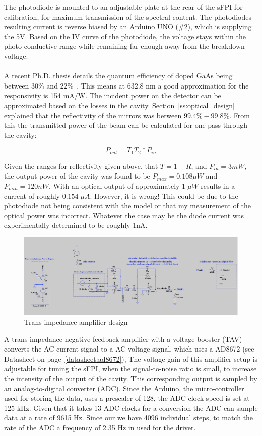 \documentclass[12pt,journal]{IEEEtran}
\begin{document}
The photodiode is mounted to an adjustable plate at the rear of the sFPI for calibration, for maximum transmission of the spectral content. The photodiodes resulting current is reverse biased by an Arduino UNO (\#2), which is supplying the 5V. Based on the IV curve of the photodiode, the voltage stays within the photo-conductive range while remaining far enough away from the breakdown voltage. 
\\\\
A recent Ph.D. thesis details the quantum efficiency of doped GaAs being between 30\% and 22\%~\cite{responsivity}. This means at 632.8 nm a good approximation for the responsivity is 154 mA/W. The incident power on the detector can be approximated based on the losses in the cavity. Section~\ref{ss:optical_design} explained that the reflectivity of the mirrors was between $99.4\% - 99.8\%$. From this the transmitted power of the beam can be calculated for one pass through the cavity:

\begin{equation}
P_{out} = T_1T_2*P_{in}
\end{equation}

Given the ranges for reflectivity given above, that $T = 1-R$, and $P_{in} = 3 mW$, the output power of the cavity was found to be $P_{max} = 0.108 \mu W$ and $P_{min} = 120 nW$. With an optical output of approximately $1\;\mu W$ results in a current of roughly $0.154\;\mu A$. However, it is wrong! This could be due to the photodiode not being consistent with the model or that my measurement of the optical power was incorrect. Whatever the case may be the diode current was experimentally determined to be roughly 1nA. 

\begin{figure}
	\centering
	\includegraphics[width=\textwidth]{./transimpedance_amp_design.png}
	\caption{Trans-impedance amplifier design}
	\label{fig{transimpedance-amp}}
\end{figure}

A trans-impedance negative-feedback amplifier with a voltage booster (TAV) converts the AC-current signal to a AC-voltage signal, which uses a AD8672 (see Datasheet on page~\ref{datasheet:ad8672}), The voltage gain of this amplifier setup is adjustable for tuning the sFPI, when the signal-to-noise ratio is small, to increase the intensity of the output of the cavity. This corresponding output is sampled by an analog-to-digital converter (ADC). Since the Arduino, the micro-controller used for storing the data, uses a prescaler of 128, the ADC clock speed is set at 125 kHz. Given that it takes 13 ADC clocks for a conversion the ADC can sample data at a rate of 9615 Hz. Since our we have 4096 individual steps, to match the rate of the ADC a frequency of 2.35 Hz in used for the driver.    
\end{document}
